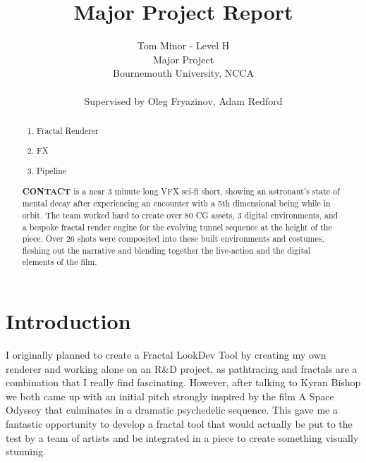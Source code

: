 \documentclass[11pt,a4paper,final,notitlepage]{report}
\makeatletter
\newcommand*{\toccontents}{\@starttoc{toc}}
\makeatother
\begin{document}
\title{ Major Project Report }

\author{ Tom Minor - Level H\\
 		 Major Project\\
 		 Bournemouth University, NCCA\\
 		 \\
 		 Supervised by Oleg Fryazinov, Adam Redford
		}

\date{}
\maketitle

\renewcommand{\abstractname}{Project Overview and Responsibilities}
\begin{abstract}

\begin{center}
\begin{varwidth}{\textwidth}
\begin{enumerate}
\item Fractal Renderer
\item FX
\item Pipeline\\
\end{enumerate}
\end{varwidth}
\end{center}

\textbf{CONTACT} is a near 3 minute long VFX sci-fi short, showing an astronaut’s state of mental decay after experiencing an encounter with a 5th dimensional being while in orbit. The team worked hard to create over 80 CG assets, 3 digital environments, and a bespoke fractal render engine for the evolving tunnel sequence at the height of the piece. Over 26 shots were composited into these built environments and costumes, fleshing out the narrative and blending together the live-action and the digital elements of the film.

\end{abstract}

\toccontents

\chapter{Introduction}
I originally planned to create a Fractal LookDev Tool by creating my own renderer and working alone on an R\&D project, as pathtracing and fractals are a combination that I really find fascinating. However, after talking to Kyran Bishop we both came up with an initial pitch strongly inspired by the film A Space Odyssey \cite{hal} that culminates in a dramatic psychedelic sequence. This gave me a fantastic opportunity to develop a fractal tool that would actually be put to the test by a team of artists and be integrated in a piece to create something visually stunning. 
\end{document}
